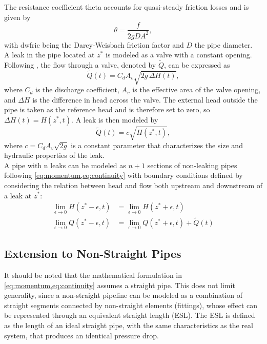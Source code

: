 The resistance coefficient \gls{theta} accounts for quasi-steady friction losses and is given by
\begin{equation*}
\theta = \frac{f}{2 g D A^{2}},
\end{equation*}
with \gls{dwfric} being the Darcy-Weisbach friction factor and $D$ the pipe diameter.\\

A leak in the pipe located at $z^*$ is modeled as a valve with a constant opening.  Following \cite[p.~54]{chaudhry2013}, the flow through a valve, denoted by $\tilde{Q}$, can be expressed as
\begin{equation*}
\tilde{Q}(t) = C_d A_v \sqrt{2 g \, \Delta H(t)},
\end{equation*}
where $C_d$ is the discharge coefficient, $A_v$ is the effective area of the valve opening, and $\Delta H$ is the difference in head across the valve. The external head outside the pipe is taken as the reference head and is therefore set to zero, so $\Delta H(t)=H(z^*,t)$. A leak is then modeled by
\begin{equation}
\tilde{Q}(t) = c \sqrt{H(z^*,t)},
\label{eq:leak_model}
\end{equation}
where $c = C_d A_v \sqrt{2 g}$ is a constant parameter that characterizes the size and hydraulic properties of the leak.\\

A pipe with \gls{n} leaks can be modeled as $n+1$ sections of non-leaking pipes following \cref{eq:momentum,eq:continuity} with boundary conditions defined by considering the relation between head and flow both upstream and downstream of a leak at $z^*$:
\begin{align}
    \lim_{\epsilon \rightarrow0} H(z^*-\epsilon,t) &= \lim_{\epsilon \rightarrow0} H(z^*+\epsilon,t) \label{eq:head_boundary} \\
    \lim_{\epsilon \rightarrow0} Q(z^*-\epsilon,t) &= \lim_{\epsilon \rightarrow0} Q(z^*+\epsilon,t) + \tilde{Q}(t) \label{eq:flow_boundary}
\end{align}

\subsection*{Extension to Non-Straight Pipes}
It should be noted that the mathematical formulation in \cref{eq:momentum,eq:continuity} assumes a straight pipe. This does not limit generality, since a non-straight pipeline can be modeled as a combination of straight segments connected by non-straight elements (fittings), whose effect can be represented through an equivalent straight length (ESL). The ESL is defined as the length of an ideal straight pipe, with the same characteristics as the real system, that produces an identical pressure drop. \\

